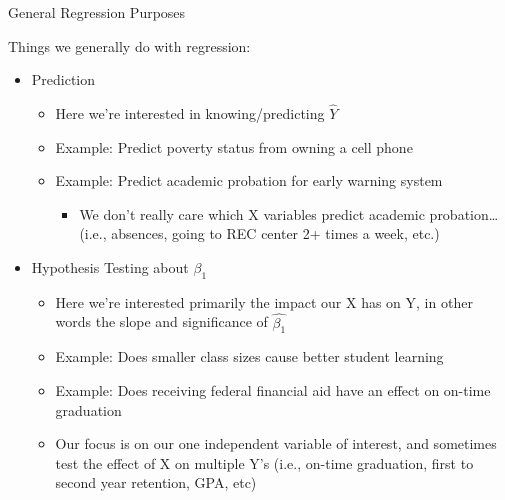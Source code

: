 \documentclass[
  8pt,
  ignorenonframetext,
  dvipsnames]{beamer}
\providecommand{\tightlist}{%
  \setlength{\itemsep}{0pt}\setlength{\parskip}{0pt}}
\let\olditem\item
\renewcommand{\item}{%
  \olditem\vspace{4pt}
}
\begin{document}
\begin{frame}{General Regression Purposes}
\protect\hypertarget{general-regression-purposes}{}

Things we generally do with regression:

\begin{itemize}
\tightlist
\item
  Prediction

  \begin{itemize}
  \tightlist
  \item
    Here we're interested in knowing/predicting \(\hat{Y}\)
  \item
    Example: Predict poverty status from owning a cell phone
  \item
    Example: Predict academic probation for early warning system

    \begin{itemize}
    \tightlist
    \item
      We don't really care which X variables predict academic
      probation\ldots{} (i.e., absences, going to REC center 2+ times a
      week, etc.)
    \end{itemize}
  \end{itemize}
\end{itemize}

\medskip

\begin{itemize}
\tightlist
\item
  Hypothesis Testing about \(\beta_1\)

  \begin{itemize}
  \tightlist
  \item
    Here we're interested primarily the impact our X has on Y, in other
    words the slope and significance of \(\hat{\beta_1}\)
  \item
    Example: Does smaller class sizes cause better student learning
  \item
    Example: Does receiving federal financial aid have an effect on
    on-time graduation
  \item
    Our focus is on our one independent variable of interest, and
    sometimes test the effect of X on multiple Y's (i.e., on-time
    graduation, first to second year retention, GPA, etc)
  \end{itemize}
\end{itemize}

\end{frame}
\end{document}
